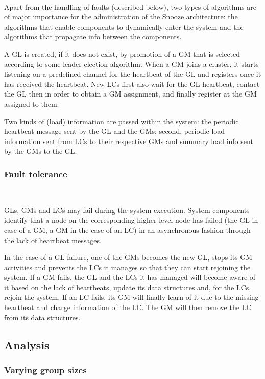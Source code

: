 ~ 

Apart from the handling of faults (described below), two types of
algorithms are of major importance for the administration of the
Snooze architecture: the algorithms that enable components to
dynamically enter the system and the algorithms that propagate info
between the components.

A GL is created, if it does not exist, by promotion of a GM that is
selected according to some leader election algorithm. When a GM joins
a cluster, it starts listening on a predefined channel for the
heartbeat of the GL and registers once it has received the
heartbeat. New LCs first also wait for the GL heartbeat, contact the
GL then in order to obtain a GM assignment, and finally register at
the GM assigned to them.

Two kinds of (load) information are passed within the system: the
periodic heartbeat message sent by the GL and the GMs; second,
periodic load information sent from LCs to their respective GMs and
summary load info sent by the GMs to the GL.

\subsubsection{Fault tolerance}

~ 

GLs, GMs and LCs may fail during the system execution. System
components identify that a node on the corresponding higher-level node
has failed (the GL in case of a GM, a GM in the case of an LC) in an
asynchronous fashion through the lack of heartbeat messages.

In the case of a GL failure, one of the GMs becomes the new GL, stops
its GM activities and prevents the LCs it manages so that they can
start rejoining the system. If a GM fails, the GL and the LCs it has
managed will become aware of it based on the lack of heartbeats,
update its data structures and, for the LCs, rejoin the system. If an
LC fails, its GM will finally learn of it due to the missing heartbeat
and charge information of the LC. The GM will then remove the LC from
its data structures.

\subsection{Analysis}


\subsubsection{Varying group sizes}


